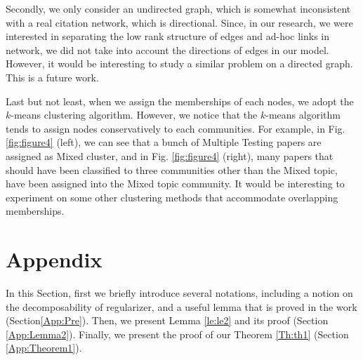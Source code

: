 \documentclass[AMS,STIX1COL]{WileyNJD-v2}
\begin{document}
{Secondly, we only consider an undirected graph, which is somewhat inconsistent with a real citation network, which is directional.
Since, in our research, we were interested in separating the low rank structure of edges and ad-hoc links in network, we did not take into account the directions of edges in our model.
However, it would be interesting to study a similar problem on a directed graph.
This is a future work.

Last but not least, when we assign the memberships of each nodes, we adopt the $k$-means clustering algorithm.
However, we notice that the $k$-means algorithm tends to assign nodes conservatively to each communities.
For example, in Fig. \ref{fig:figure4} (left), we can see that a bunch of Multiple Testing papers are assigned as Mixed cluster, and in Fig. \ref{fig:figure4} (right), many papers that should have been classified to three communities other than the Mixed topic, have been assigned into the Mixed topic community.
It would be interesting to experiment on some other clustering methods that accommodate overlapping memberships.

\section{Appendix}

In this Section, first we briefly introduce several notations, including a notion on the decomposability of regularizer, and a useful lemma that is proved in the work \cite{agarwal2012noisy} (Section\ref{App:Pre}).
Then, we present Lemma \ref{le:le2} and its proof (Section \ref{App:Lemma2}).
Finally, we present the proof of our Theorem \ref{Th:th1} (Section \ref{App:Theorem1}).

}
\end{document}
